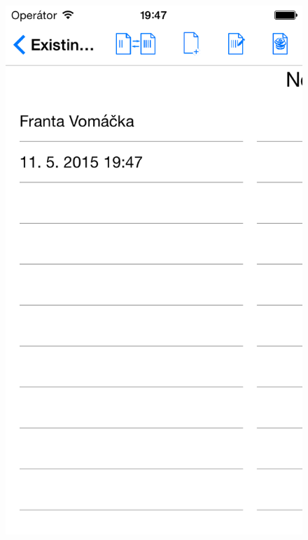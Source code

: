 \begin{figure}[h]
\centering
\begin{minipage}{.5\textwidth}
  \centering
  \includegraphics[width=.95\textwidth]{accounts1.png}
  \label{fig:accountspage1}
\end{minipage}%
\begin{minipage}{.5\textwidth}
  \centering

\end{minipage}
\end{figure}
